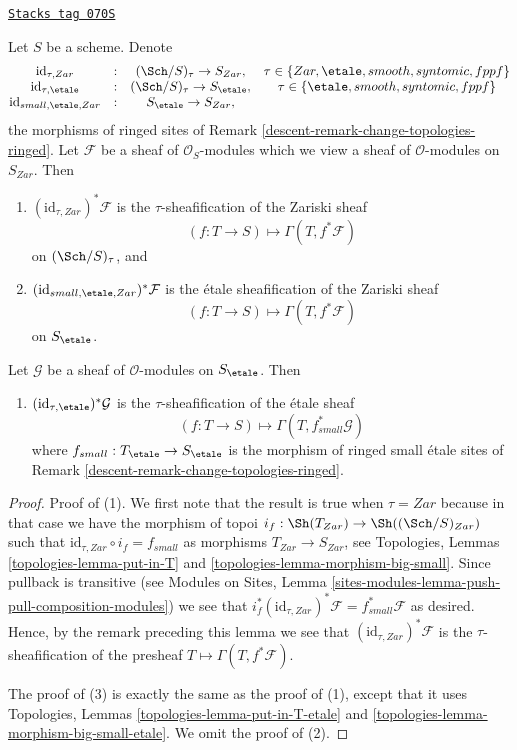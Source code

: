 \begin{lemma}
\label{descent-lemma-compare-sites}
\href{https://stacks.math.columbia.edu/tag/070S}{\texttt{Stacks tag 070S}}

Let $S$ be a scheme. Denote
$$
\begin{matrix}
\text{id}_{\tau, Zar} & : & (\Sch/S)_\tau \to S_{Zar}, &
\tau \in \{Zar, \etale, smooth, syntomic, fppf\} \\
\text{id}_{\tau, \etale} & : &
(\Sch/S)_\tau \to S_\etale, &
\tau \in \{\etale, smooth, syntomic, fppf\} \\
\text{id}_{small, \etale, Zar} & : & S_\etale \to S_{Zar},
\end{matrix}
$$
the morphisms of ringed sites of
Remark \ref{descent-remark-change-topologies-ringed}.
Let $\mathcal{F}$ be a sheaf of $\mathcal{O}_S$-modules
which we view a sheaf of $\mathcal{O}$-modules on $S_{Zar}$. Then
\begin{enumerate}
\item $(\text{id}_{\tau, Zar})^*\mathcal{F}$ is the $\tau$-sheafification
of the Zariski sheaf
$$
(f : T \to S) \longmapsto \Gamma(T, f^*\mathcal{F})
$$
on $(\Sch/S)_\tau$, and
\item $(\text{id}_{small, \etale, Zar})^*\mathcal{F}$ is the
\'etale sheafification of the Zariski sheaf
$$
(f : T \to S) \longmapsto \Gamma(T, f^*\mathcal{F})
$$
on $S_\etale$.
\end{enumerate}
Let $\mathcal{G}$ be a sheaf of $\mathcal{O}$-modules
on $S_\etale$. Then
\begin{enumerate}
\item[(3)] $(\text{id}_{\tau, \etale})^*\mathcal{G}$ is the
$\tau$-sheafification of the \'etale sheaf
$$
(f : T \to S) \longmapsto \Gamma(T, f_{small}^*\mathcal{G})
$$
where $f_{small} : T_\etale \to S_\etale$
is the morphism of ringed small \'etale sites of
Remark \ref{descent-remark-change-topologies-ringed}.
\end{enumerate}
\end{lemma}

\begin{proof}
Proof of (1). We first note that the result is true when $\tau = Zar$
because in that case we have the morphism of topoi
$i_f : \Sh(T_{Zar}) \to \Sh((\Sch/S)_{Zar})$
such that $\text{id}_{\tau, Zar} \circ i_f = f_{small}$ as morphisms
$T_{Zar} \to S_{Zar}$, see
Topologies, Lemmas \ref{topologies-lemma-put-in-T} and
\ref{topologies-lemma-morphism-big-small}.
Since pullback is transitive (see
Modules on Sites,
Lemma \ref{sites-modules-lemma-push-pull-composition-modules})
we see that
$i_f^*(\text{id}_{\tau, Zar})^*\mathcal{F} = f_{small}^*\mathcal{F}$
as desired. Hence, by the remark preceding this lemma we see that
$(\text{id}_{\tau, Zar})^*\mathcal{F}$ is the $\tau$-sheafification of
the presheaf $T \mapsto \Gamma(T, f^*\mathcal{F})$.

\medskip\noindent
The proof of (3) is exactly the same as the proof of (1), except that it
uses
Topologies, Lemmas \ref{topologies-lemma-put-in-T-etale} and
\ref{topologies-lemma-morphism-big-small-etale}.
We omit the proof of (2).
\end{proof}


